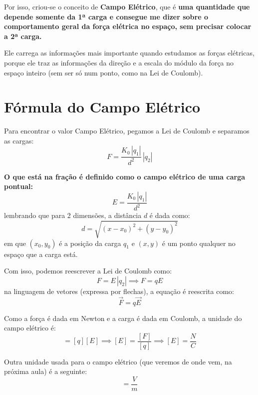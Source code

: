 \documentclass[12pt]{extarticle}
\newcommand{\<}{\langle}
\renewcommand{\>}{\rangle}
\theoremstyle{definition}
\begin{document}
Por isso, criou-se o conceito de \textbf{Campo Elétrico}, que é \textbf{uma quantidade que depende somente da 1ª carga e consegue me dizer sobre o comportamento geral da força elétrica no espaço, sem precisar colocar a 2ª carga.}

Ele carrega as informações mais importante quando estudamos as forças elétricas, porque ele traz as informações da direção e a escala do módulo da força no espaço inteiro (sem ser só num ponto, como na Lei de Coulomb).

\section{Fórmula do Campo Elétrico}
Para encontrar o valor Campo Elétrico, pegamos a Lei de Coulomb e separamos as cargas:
\begin{equation}
    F = \frac{K_0\,|q_1|}{d^2}\,|q_2|
\end{equation}

\textbf{O que está na fração é definido como o campo elétrico de uma carga pontual:}
\begin{equation}
    \boxed{E = \frac{K_0\, |q_1|}{d^2}}
\end{equation}
\noindent lembrando que para 2 dimensões, a distância $d$ é dada como:
\begin{equation}
    d = \sqrt{(x-x_0)^2 + (y-y_0)^2}
\end{equation}
\noindent em que $(x_0,y_0)$ é a posição da carga $q_1$ e $(x,y)$ é um ponto qualquer no espaço que a carga está.

Com isso, podemos reescrever a Lei de Coulomb como:
\begin{equation} \label{eq:force_field}
    F = E\,|q_2| \implies \boxed{F= qE}
\end{equation}
\noindent na linguagem de vetores (expressa por flechas), a equação é reescrita como:
\begin{equation}
    \vec{F} = q\vec{E}
\end{equation}

Como a força é dada em Newton e a carga é dada em Coulomb, a unidade do campo elétrico é:
\begin{equation}
    [F]=[q][E] \implies[E]=\frac{[F]}{[q]} \implies [E]= \frac{N}{C}
\end{equation}

Outra unidade usada para o campo elétrico (que veremos de onde vem, na próxima aula) é a seguinte:
\begin{equation}
    [E]= \frac{V}{m}
\end{equation}
\end{document}
